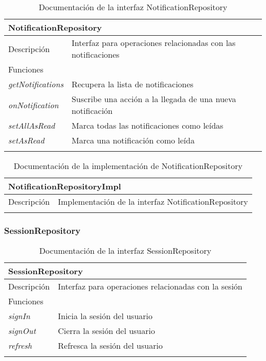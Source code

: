 \begin{longtable}{|p{} p{}|}
    \hline
    \multicolumn{2}{|l|}{\textbf{NotificationRepository}} \\ \hline \hline
    Descripción      & Interfaz para operaciones relacionadas con las notificaciones \\ \hline
    \multicolumn{2}{|l|}{Funciones} \\
    \emph{getNotifications}  & Recupera la lista de notificaciones \\
    \emph{onNotification}  & Suscribe una acción a la llegada de una nueva notificación \\
    \emph{setAllAsRead}  & Marca todas las notificaciones como leídas \\
    \emph{setAsRead}  & Marca una notificación como leída \\ \hline
    \caption{Documentación de la interfaz NotificationRepository}
    \label{dis:app:notification_repository}
\end{longtable}

\begin{longtable}{|p{} p{}|}
    \hline
    \multicolumn{2}{|l|}{\textbf{NotificationRepositoryImpl}} \\ \hline \hline
    Descripción      & Implementación de la interfaz NotificationRepository \\ \hline
    \caption{Documentación de la implementación de NotificationRepository}
    \label{dis:app:notification_repository_impl}
\end{longtable}

\subsubsection{SessionRepository}

\begin{longtable}{|p{} p{}|}
    \hline
    \multicolumn{2}{|l|}{\textbf{SessionRepository}} \\ \hline \hline
    Descripción      & Interfaz para operaciones relacionadas con la sesión \\ \hline
    \multicolumn{2}{|l|}{Funciones} \\
    \emph{signIn}   & Inicia la sesión del usuario \\
    \emph{signOut}  & Cierra la sesión del usuario \\
    \emph{refresh}  & Refresca la sesión del usuario \\ \hline
    \caption{Documentación de la interfaz SessionRepository}
    \label{dis:app:session_repository}
\end{longtable}

